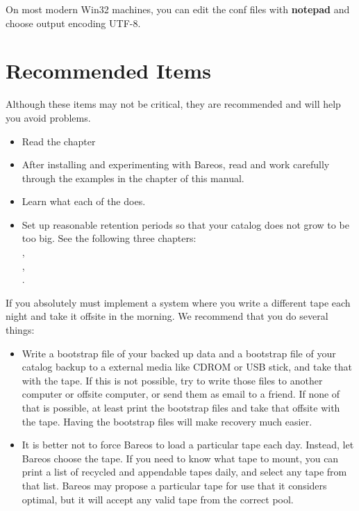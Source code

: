 \begin{itemize}
   On most modern Win32 machines, you can edit the conf files with {\bf
   notepad} and choose output encoding UTF-8.
\end{itemize}

\section{Recommended Items}

Although these items may not be critical, they are recommended and will help
you avoid problems.

\begin{itemize}
\item Read the  chapter
\item After installing and experimenting with Bareos, read and work carefully
   through the examples in the
    chapter  of this manual.
\item Learn what each of the 
   does.
\item Set up reasonable retention periods so that your catalog does not  grow
   to be too big. See the following three chapters:\\
   ,\\
   ,\\
   .
\end{itemize}

If you absolutely must implement a system where you write a different
tape each night and take it offsite in the morning. We recommend that you do
several things:
\begin{itemize}
\item Write a bootstrap file of your backed up data and a bootstrap file
   of your catalog backup to a external media like CDROM or USB stick, and take that with
   the tape.  If this is not possible, try to write those files to another
   computer or offsite computer, or send them as email to a friend. If none
   of that is possible, at least print the bootstrap files and take that
   offsite with the tape.  Having the bootstrap files will make recovery
   much easier.
\item It is better not to force Bareos to load a particular tape each day.
   Instead, let Bareos choose the tape.  If you need to know what tape to
   mount, you can print a list of recycled and appendable tapes daily, and
   select any tape from that list.  Bareos may propose a particular tape
   for use that it considers optimal, but it will accept any valid tape
   from the correct pool.
\end{itemize}
